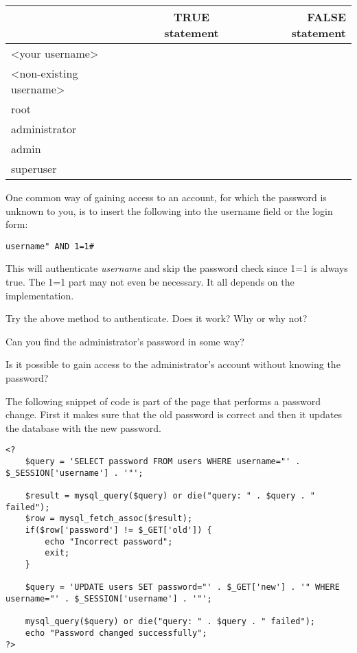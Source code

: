 \documentclass[EITN41]{../tex/cryptosecuritylab}
\begin{document}
\begin{tabular}{| l |c |r |}
\hline
    & TRUE statement & FALSE statement \\
\hline
\textless your username\textgreater & & \\
\hline
\textless non-existing username\textgreater & & \\
\hline
  root &  &  \\
\hline
  administrator  &  &  \\
\hline
  admin &  &  \\
\hline
  superuser &  & \\
\hline
\end{tabular}

One common way of gaining access to an account, for which the password is unknown to you, is to insert the following into the username field or the login form:
\begin{verbatim}
username" AND 1=1#
\end{verbatim}
This will authenticate \textit{username} and skip the password check since 1=1 is always true. The 1=1 part may not even be necessary. It all depends on the implementation.

\bprob
\item Try the above method to authenticate. Does it work? Why or why not?
\item Can you find the administrator's password in some way?
\item Is it possible to gain access to the administrator's account without knowing the password?
\eprob

The following snippet of code is part of the page that performs a password change. First it makes sure that the old password is correct and then it updates the database with the new password.
\begingroup
    \fontsize{7pt}{8pt}\selectfont
\begin{verbatim}
<?
    $query = 'SELECT password FROM users WHERE username="' . $_SESSION['username'] . '"';

    $result = mysql_query($query) or die("query: " . $query . " failed");
    $row = mysql_fetch_assoc($result);
    if($row['password'] != $_GET['old']) {
        echo "Incorrect password";
        exit;
    }

    $query = 'UPDATE users SET password="' . $_GET['new'] . '" WHERE username="' . $_SESSION['username'] . '"';

    mysql_query($query) or die("query: " . $query . " failed");
    echo "Password changed successfully";
?>
\end{verbatim}
\endgroup
\end{document}
